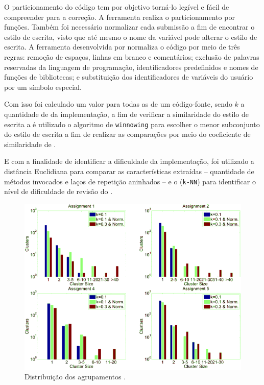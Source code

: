 		O particionamento do código tem por objetivo torná-lo legível e fácil de
		compreender para a correção. A ferramenta realiza o particionamento por funções.
		Também foi necessário normalizar cada submissão a fim de encontrar o estilo de
		escrita, visto que até mesmo o nome da variável pode alterar o estilo de escrita.
		A ferramenta desenvolvida por  normaliza o código por meio
		de três regras: remoção de espaços, linhas em branco e comentários; exclusão
		de palavras reservadas da linguagem de programação, identificadores predefinidos
		e nomes de funções de bibliotecas; e substituição dos identificadores de
		variáveis do usuário por um símbolo especial.
		
		Com isso foi calculado um valor  para todas as 
		de um código-fonte, sendo $k$ a quantidade de  da implementação,
		a fim de verificar a similaridade do estilo de escrita  a
		 é utilizado o algoritmo de \texttt{winnowing} \cite{schleimer2003}
		para escolher o menor subconjunto do estilo de escrita a fim de realizar as
		comparações por meio do coeficiente de similaridade de  \cite{jaccard1901}.
		
		E com a finalidade de identificar a dificuldade da implementação, foi utilizado
		a distância Euclidiana para comparar as características extraídas -- quantidade
		de métodos invocados e laços de repetição aninhados -- e o 
		(\texttt{k-NN}) para identificar o nível de dificuldade de revisão do
		.
		
		\begin{figure}
			\centering
			\includegraphics[width=0.7\linewidth]{imagem/clusteringPerformance}
			\caption[Distribuição dos agrupamentos]{Distribuição dos agrupamentos \cite{Wei2015}.}
			\label{fig:clusteringPerformance}
		\end{figure}
		
